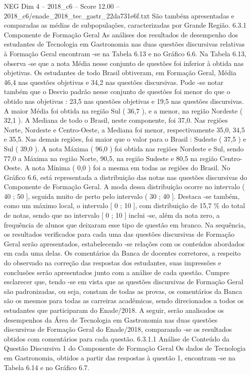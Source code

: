 \begin{textsample}{NEG Dim 4 – 2018\_c6 – Score 12.00 – 2018\_c6/enade\_2018\_tec\_gastr\_22da731e6f.txt}
São também apresentadas e comparadas as médias de subpopulações, caracterizadas por Grande Região. 6.3.1 Componente de Formação Geral As análises dos resultados de desempenho dos estudantes de Tecnologia em Gastronomia nas duas questões discursivas relativas à Formação Geral encontram -se na Tabela 6.13 e no Gráfico 6.6.
Na Tabela 6.13, observa -se que a nota Média nesse conjunto de questões foi inferior à obtida nas objetivas.
Os estudantes de todo Brasil obtiveram, em Formação Geral, Média 46,4 nas questões objetivas e 34,2 nas questões discursivas.
Pode -se notar também que o Desvio padrão nesse conjunto de questões foi menor do que o obtido nas objetivas : 23,5 nas questões objetivas e 19,5 nas questões discursivas.
A maior Média foi obtida na região Sul ( 36,7 ), e a menor, na região Nordeste ( 32,1 ).
A Mediana de todo o Brasil, neste componente, foi 37,0.
Nas regiões Norte, Nordeste e Centro-Oeste, a Mediana foi menor, respectivamente 35,0, 34,5 e 35,5.
Nas demais regiões, foi maior que o valor para o Brasil : Sudeste ( 37,5 ) e Sul ( 39,0 ).
A nota Máxima ( 96,0 ) foi obtida nas regiões Nordeste e Sul, sendo 77,0 a Máxima na região Norte, 90,5, na região Sudeste e 80,5 na região Centro-Oeste.
A nota Mínima ( 0,0 ) foi a mesma em todas as regiões do Brasil.
No Gráfico 6.6, está representada a distribuição das notas nas questões discursivas do Componente de Formação Geral.
A moda dessa distribuição ocorre no intervalo ( 40 ; 50 ], seguida muito de perto pelo intervalo ( 30 ; 40 ].
Destaca -se também, como um máximo local, o intervalo [ 0 ; 10 ], com distribuição de 15,7 \% do total de notas, sendo que no intervalo [ 0 ; 10 ] inclui -se, além da nota zero, a frequência de alunos que deixaram esse tipo de questão em branco.
Na sequência, os resultados verificados para cada uma das questões discursivas de Formação Geral serão apresentados, estabelecendo -se relações com os conteúdos abordados em cada uma delas.
Os comentários da Banca de docentes corretores, a respeito do observado na correção das respostas dos estudantes, suas impressões e conclusões serão apresentados junto com a análise de cada questão.
Cumpre esclarecer que, tendo -se em vista que as questões discursivas de Formação Geral são padronizadas, ou seja, constam de todas as provas, os comentários da Banca são os mesmos para todas as carreiras acadêmicas, sendo direcionados a todos os estudantes que participaram do Enade/2018.
A seguir, serão analisados os desempenhos da Área de Tecnologia em Gastronomia nas duas questões discursivas de Formação Geral do Enade/2018, comparando -se os resultados obtidos com comentários para cada questão. 6.3.1.1 Análise de Conteúdo da Questão Discursiva 1 do Componente de Formação Geral Os dados de Tecnologia em Gastronomia, obtidos a partir das respostas à questão 1, encontram -se na Tabela 6.14 e no Gráfico 6.7.

\end{textsample}
